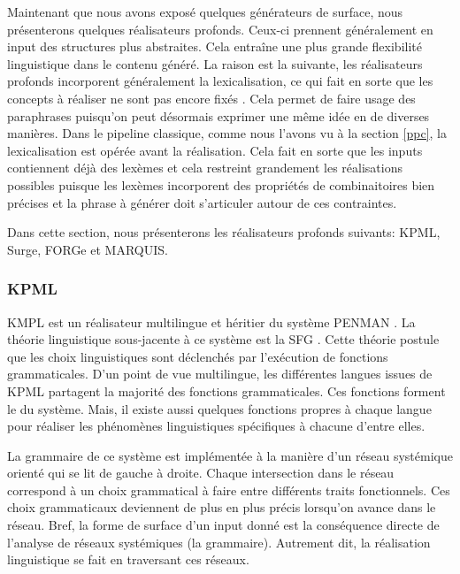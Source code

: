 Maintenant que nous avons exposé quelques générateurs de surface, nous présenterons quelques réalisateurs profonds. Ceux-ci prennent généralement en input des structures plus abstraites. Cela entraîne une plus grande flexibilité linguistique dans le contenu généré. La raison est la suivante, les réalisateurs profonds incorporent généralement la lexicalisation, ce qui fait en sorte que les concepts à réaliser ne sont pas encore fixés \citep{PolguerePourmodelestratifie}. Cela permet de faire usage des paraphrases puisqu'on peut désormais exprimer une même idée en de diverses manières. Dans le pipeline classique, comme nous l'avons vu à la section \ref{ppc}, la lexicalisation est opérée avant la réalisation. Cela fait en sorte que les inputs contiennent déjà des lexèmes et cela restreint grandement les réalisations possibles puisque les lexèmes incorporent des propriétés de combinaitoires bien précises et la phrase à générer doit s'articuler autour de ces contraintes. 

Dans cette section, nous présenterons les réalisateurs profonds suivants: KPML, Surge, FORGe et MARQUIS.

\subsubsection{KPML}
KMPL\citep{BatemanEnablingTechnologyMultilingual1997} est un réalisateur multilingue et héritier du système PENMAN \citep{PenmanOverview}. La théorie linguistique sous-jacente à ce système est la \acf{SFG} \citep{MatthiessenSystemicfunctionalgrammar1997}. Cette théorie postule que les choix linguistiques sont déclenchés par l'exécution de fonctions grammaticales. D'un point de vue multilingue, les différentes langues issues de KPML partagent la majorité des fonctions grammaticales. Ces fonctions forment le du système. Mais, il existe aussi quelques fonctions propres à chaque langue pour réaliser les phénomènes linguistiques spécifiques à chacune d'entre elles. 

La grammaire de ce système est implémentée à la manière d'un réseau systémique orienté qui se lit de gauche à droite. Chaque intersection dans le réseau correspond à un choix grammatical à faire entre différents traits fonctionnels. Ces choix grammaticaux deviennent de plus en plus précis lorsqu'on avance dans le réseau. Bref, la forme de surface  d'un input donné est la conséquence directe de l'analyse de réseaux systémiques (la grammaire). Autrement dit, la réalisation linguistique se fait en traversant ces réseaux. 

